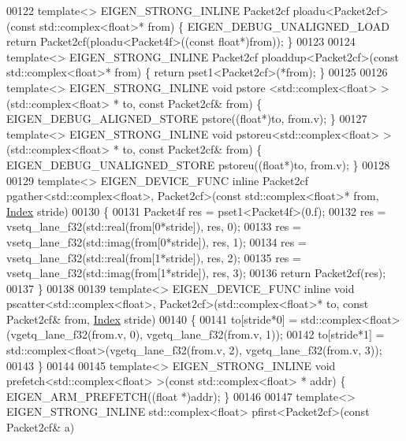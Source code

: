 \begin{DoxyCode}
00122 \textcolor{keyword}{template}<> EIGEN\_STRONG\_INLINE Packet2cf ploadu<Packet2cf>(\textcolor{keyword}{const} std::complex<float>* from) \{ 
      EIGEN\_DEBUG\_UNALIGNED\_LOAD \textcolor{keywordflow}{return} Packet2cf(ploadu<Packet4f>((\textcolor{keyword}{const} \textcolor{keywordtype}{float}*)from)); \}
00123 
00124 \textcolor{keyword}{template}<> EIGEN\_STRONG\_INLINE Packet2cf ploaddup<Packet2cf>(\textcolor{keyword}{const} std::complex<float>* from) \{ \textcolor{keywordflow}{return} 
      pset1<Packet2cf>(*from); \}
00125 
00126 \textcolor{keyword}{template}<> EIGEN\_STRONG\_INLINE \textcolor{keywordtype}{void} pstore <std::complex<float> >(std::complex<float> *   to, \textcolor{keyword}{const} 
      Packet2cf& from) \{ EIGEN\_DEBUG\_ALIGNED\_STORE pstore((\textcolor{keywordtype}{float}*)to, from.v); \}
00127 \textcolor{keyword}{template}<> EIGEN\_STRONG\_INLINE \textcolor{keywordtype}{void} pstoreu<std::complex<float> >(std::complex<float> *   to, \textcolor{keyword}{const} 
      Packet2cf& from) \{ EIGEN\_DEBUG\_UNALIGNED\_STORE pstoreu((\textcolor{keywordtype}{float}*)to, from.v); \}
00128 
00129 \textcolor{keyword}{template}<> EIGEN\_DEVICE\_FUNC \textcolor{keyword}{inline} Packet2cf pgather<std::complex<float>, Packet2cf>(\textcolor{keyword}{const} 
      std::complex<float>* from, \hyperlink{namespace_eigen_a62e77e0933482dafde8fe197d9a2cfde}{Index} stride)
00130 \{
00131   Packet4f res = pset1<Packet4f>(0.f);
00132   res = vsetq\_lane\_f32(std::real(from[0*stride]), res, 0);
00133   res = vsetq\_lane\_f32(std::imag(from[0*stride]), res, 1);
00134   res = vsetq\_lane\_f32(std::real(from[1*stride]), res, 2);
00135   res = vsetq\_lane\_f32(std::imag(from[1*stride]), res, 3);
00136   \textcolor{keywordflow}{return} Packet2cf(res);
00137 \}
00138 
00139 \textcolor{keyword}{template}<> EIGEN\_DEVICE\_FUNC \textcolor{keyword}{inline} \textcolor{keywordtype}{void} pscatter<std::complex<float>, Packet2cf>(std::complex<float>* to, \textcolor{keyword}{
      const} Packet2cf& from, \hyperlink{namespace_eigen_a62e77e0933482dafde8fe197d9a2cfde}{Index} stride)
00140 \{
00141   to[stride*0] = std::complex<float>(vgetq\_lane\_f32(from.v, 0), vgetq\_lane\_f32(from.v, 1));
00142   to[stride*1] = std::complex<float>(vgetq\_lane\_f32(from.v, 2), vgetq\_lane\_f32(from.v, 3));
00143 \}
00144 
00145 \textcolor{keyword}{template}<> EIGEN\_STRONG\_INLINE \textcolor{keywordtype}{void} prefetch<std::complex<float> >(\textcolor{keyword}{const} std::complex<float> *   addr) \{ 
      EIGEN\_ARM\_PREFETCH((\textcolor{keywordtype}{float} *)addr); \}
00146 
00147 \textcolor{keyword}{template}<> EIGEN\_STRONG\_INLINE std::complex<float>  pfirst<Packet2cf>(\textcolor{keyword}{const} Packet2cf& a)

\end{DoxyCode}
